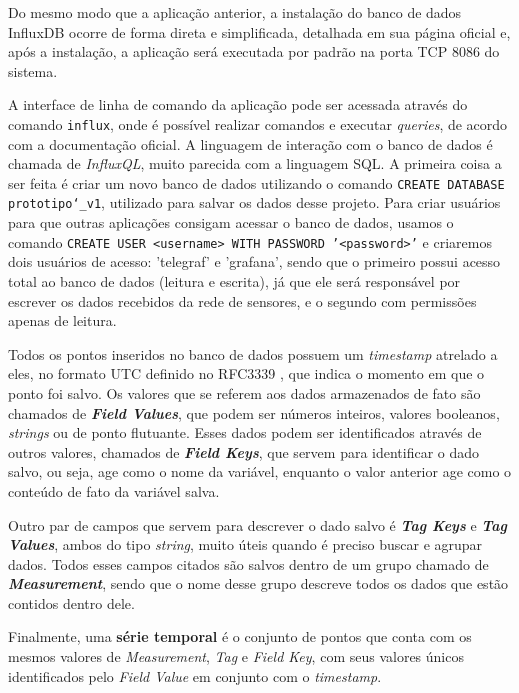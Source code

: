 \documentclass[../monografia.tex]{subfiles}
\begin{document}
Do mesmo modo que a aplicação anterior, a instalação do banco de dados InfluxDB ocorre de forma direta e simplificada, detalhada em sua página oficial \cite{influxdb-installation} e, após a instalação, a aplicação será executada por padrão na porta TCP 8086 do sistema. 

A interface de linha de comando da aplicação pode ser acessada através do comando \texttt{influx}, onde é possível realizar comandos e executar \textit{queries}, de acordo com a documentação oficial. A linguagem de interação com o banco de dados é chamada de \textit{InfluxQL}, muito parecida com a linguagem SQL. A primeira coisa a ser feita é criar um novo banco de dados utilizando o comando \texttt{CREATE DATABASE prototipo\char`_v1}, utilizado para salvar os dados desse projeto. Para criar usuários para que outras aplicações consigam acessar o banco de dados, usamos o comando \texttt{CREATE USER <username> WITH PASSWORD '<password>'} e criaremos dois usuários de acesso: 'telegraf' e 'grafana', sendo que o primeiro possui acesso total ao banco de dados (leitura e escrita), já que ele será responsável por escrever os dados recebidos da rede de sensores, e o segundo com permissões apenas de leitura. 

Todos os pontos inseridos no banco de dados possuem um \textit{timestamp} atrelado a eles, no formato UTC definido no RFC3339 \cite{rfc3339}, que indica o momento em que o ponto foi salvo. Os valores que se referem aos dados armazenados de fato são chamados de \textit{\textbf{Field Values}}, que podem ser números inteiros, valores booleanos, \textit{strings} ou de ponto flutuante. Esses dados podem ser identificados através de outros valores, chamados de \textit{\textbf{Field Keys}}, que servem para identificar o dado salvo, ou seja, age como o nome da variável, enquanto o valor anterior age como o conteúdo de fato da variável salva.

Outro par de campos que servem para descrever o dado salvo é \textit{\textbf{Tag Keys}} e \textit{\textbf{Tag Values}}, ambos do tipo \textit{string}, muito úteis quando é preciso buscar e agrupar dados. Todos esses campos citados são salvos dentro de um grupo chamado de \textit{\textbf{Measurement}}, sendo que o nome desse grupo descreve todos os dados que estão contidos dentro dele.

Finalmente, uma \textbf{série temporal} é o conjunto de pontos que conta com os mesmos valores de \textit{Measurement}, \textit{Tag} e \textit{Field Key}, com seus valores únicos identificados pelo \textit{Field Value} em conjunto com o \textit{timestamp}.
\end{document}
